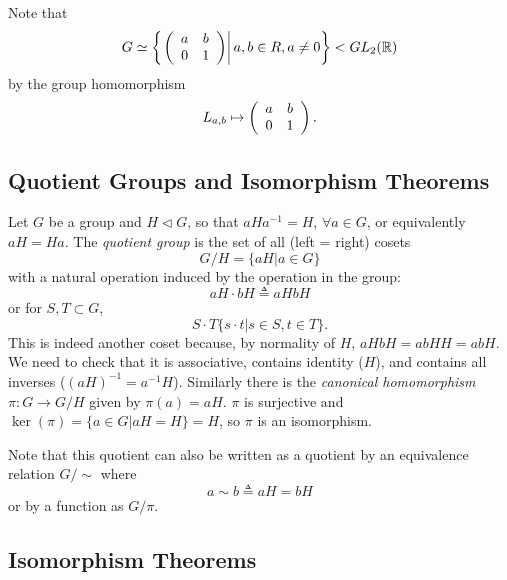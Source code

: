 \documentclass{article}
\begin{document}
Note that
$$
G \simeq \left\{
\left.\left(\begin{array}{c c}
a & b \\ 0 & 1
\end{array}\right)\right| a, b \in R, a \neq 0
\right\} < GL_2(\mathbb{R})
$$
by the group homomorphism
$$
L_{a,b} \mapsto \left(\begin{array}{c c}
a & b \\ 0 & 1
\end{array}\right).
$$

\subsection{Quotient Groups and Isomorphism Theorems}

\begin{defn}
Let $G$ be a group and $H \triangleleft G$, so that $aHa^{-1} = H$,
$\forall a \in G$, or equivalently $aH = Ha$.
The \emph{quotient group} is the set of all (left = right) cosets
$$
G / H = \{ aH | a \in G \}
$$
with a natural operation induced by the operation in the group:
$$
aH \cdot bH \triangleq aHbH
$$
or for $S, T \subset G$,
$$
S \cdot T \{ s \cdot t | s \in S, t \in T \}.
$$
This is indeed another coset because, by normality of $H$,
$aHbH = abHH = abH$. We need to check that it is associative, contains
identity ($H$), and contains all inverses ($(aH)^{-1} = a^{-1}H$). 
Similarly there is the
\emph{canonical homomorphism} $\pi : G \to G/H$ given by 
$\pi(a) = aH$. $\pi$ is surjective and
$\ker(\pi) = \{ a \in G | aH = H \} = H$, so $\pi$ is an isomorphism.
\end{defn}

Note that this quotient can also be written as a quotient by an
equivalence relation $G/\sim$ where
$$
a \sim b \triangleq aH = bH
$$
or by a function as $G/\pi$.

\subsection{Isomorphism Theorems}
\end{document}
